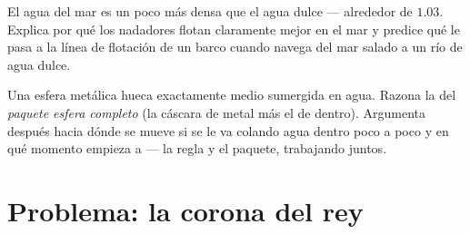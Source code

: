 \begin{exercise}[$\star\star$]\label{exo:g6:density-floating:11}
El agua del mar es un poco más densa que el agua dulce --- alrededor
de $1.03$. Explica por qué los nadadores flotan claramente mejor en
el mar y predice qué le pasa a la línea de flotación de un barco
cuando navega del mar salado a un río de agua dulce.
\end{exercise}

\begin{exercise}[$\star\star\star$]\label{exo:g6:density-floating:12}
Una esfera metálica hueca  exactamente medio sumergida en
agua. Razona la  del \emph{paquete esfera completo} (la
cáscara de metal más el  de dentro). Argumenta después hacia
dónde se mueve si se le va colando agua dentro poco a poco y en qué
momento empieza a  --- la regla y el paquete, trabajando
juntos.
\end{exercise}

\section{Problema: la corona del rey}

